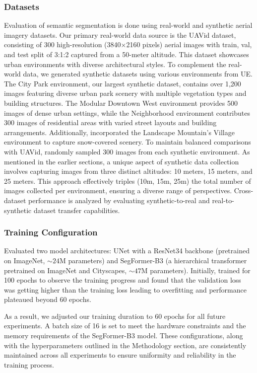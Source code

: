 \documentclass[../report.tex]{subfiles}
\begin{document}
    \subsubsection{Datasets}
    Evaluation of semantic segmentation is done using real-world and synthetic aerial imagery datasets. Our primary real-world data source is the UAVid dataset, consisting of 300 high-resolution (3840×2160 pixels) aerial images with train, val, and test split of 3:1:2 captured from a 50-meter altitude. This dataset showcases urban environments with diverse architectural styles. To complement the real-world data, we generated synthetic datasets using various environments from UE. The City Park environment, our largest synthetic dataset, contains over 1,200 images featuring diverse urban park scenery with multiple vegetation types and building structures. The Modular Downtown West environment provides 500 images of dense urban settings, while the Neighborhood environment contributes 300 images of residential areas with varied street layouts and building arrangements. Additionally, incorporated the Landscape Mountain's Village environment to capture snow-covered scenery. To maintain balanced comparisons with UAVid, randomly sampled 300 images from each synthetic environment. As mentioned in the earlier sections, a unique aspect of synthetic data collection involves capturing images from three distinct altitudes: 10 meters, 15 meters, and 25 meters. This approach effectively triples (10m, 15m, 25m) the total number of images collected per environment, ensuring a diverse range of perspectives. Cross-dataset performance is analyzed by evaluating synthetic-to-real and real-to-synthetic dataset transfer capabilities.
    
    \subsubsection{Training Configuration}
    
    Evaluated two model architectures: UNet with a ResNet34 backbone (pretrained on ImageNet, $\sim\text{24M}$ parameters) and SegFormer-B3 (a hierarchical transformer pretrained on ImageNet and Cityscapes, $\sim\text{47M}$ parameters). Initially, trained for 100 epochs to observe the training progress and found that the validation loss was getting higher than the training loss leading to overfitting and performance plateaued beyond 60 epochs. 
    
    As a result, we adjusted our training duration to 60 epochs for all future experiments. A batch size of 16 is set to meet the hardware constraints and the memory requirements of the SegFormer-B3 model. These configurations, along with the hyperparameters outlined in the Methodology section, are consistently maintained across all experiments to ensure uniformity and reliability in the training process. 
\end{document}
